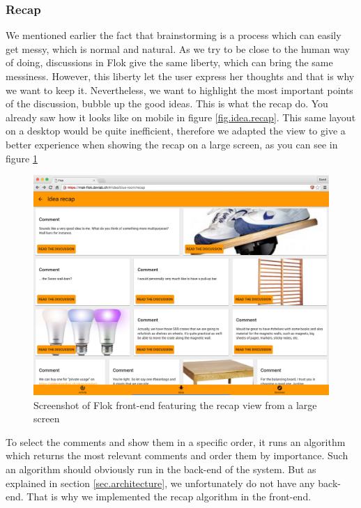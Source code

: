 \documentclass[a4paper,12pt, oneside]{article}
\begin{document}
\subsubsection{Recap}
\label{sec.recap}
We mentioned earlier the fact that brainstorming is a process which can easily get messy, which is normal and natural.
As we try to be close to the human way of doing, discussions in Flok give the same liberty, which can bring the same messiness.
However, this liberty let the user express her thoughts and that is why we want to keep it.
Nevertheless, we want to highlight the most important points of the discussion, bubble up the good ideas.
This is what the recap do.
You already saw how it looks like on mobile in figure \ref{fig.idea.recap}.
This same layout on a desktop would be quite inefficient, therefore we adapted the view to give a better experience when showing the recap on a large screen, as you can see in figure \ref{fig.recap.desktop}

\begin{figure}[!htb]
    \centering
    \includegraphics[width=\textwidth]{images/recapDesktop.png}
    \caption{Screenshot of Flok front-end featuring the recap view from a large screen}
    \label{fig.recap.desktop}
\end{figure}

To select the comments and show them in a specific order, it runs an algorithm which returns the most relevant comments and order them by importance.
Such an algorithm should obviously run in the back-end of the system.
But as explained in section \ref{sec.architecture}, we unfortunately do not have any back-end.
That is why we implemented the recap algorithm in the front-end.
\end{document}
